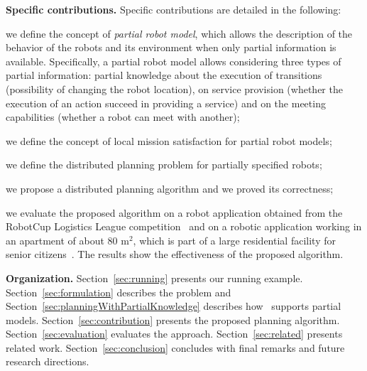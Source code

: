 \textbf{Specific contributions.} Specific contributions are detailed in the following:
\begin{enumerate*}
\item we define the concept of \emph{partial robot model}, which allows the description of the behavior of the robots and its environment when only partial information is available. 
Specifically, a partial robot model allows considering three types of partial information: partial knowledge about the execution of transitions (possibility of changing the robot location), on service provision (whether the execution of an action succeed in providing a service) and on the meeting capabilities (whether a robot can meet with another);
\item we define the concept of local mission satisfaction for partial robot models;
\item we define the distributed planning problem for partially specified robots;
\item we propose a distributed planning algorithm and we proved its correctness;
\item we evaluate the proposed algorithm on a robot application obtained from the RobotCup Logistics League competition~\cite{karrasrobocup} and
on a robotic application working in an apartment of about 80 m$^2$, which is part of a large residential facility for senior citizens~\cite{map}.
The results show the effectiveness of the proposed algorithm.
\end{enumerate*}

\textbf{Organization.} 
Section~\ref{sec:running} presents our running example.
Section~\ref{sec:formulation} describes the problem and Section~\ref{sec:planningWithPartialKnowledge} describes how \toolName\ supports partial models.
Section~\ref{sec:contribution} presents the proposed planning algorithm.
Section~\ref{sec:evaluation} evaluates the approach.
Section~\ref{sec:related} presents related work.
Section~\ref{sec:conclusion} concludes with final remarks and future research directions.